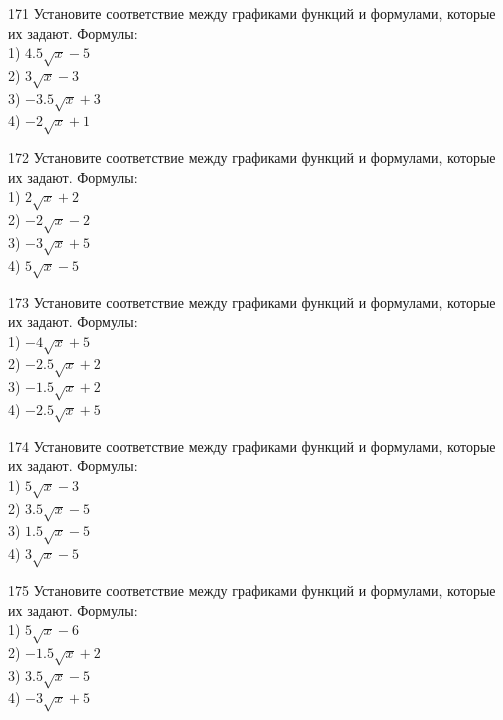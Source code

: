 \documentclass[4apaper]{article}
\begin{document}
\begin{taskBN}{171}
Установите соответствие между графиками функций и формулами, которые их задают. Формулы: \\1) $4.5\sqrt{x}-5$\\2) $3\sqrt{x}-3$\\3) $-3.5\sqrt{x}+3$\\4) $-2\sqrt{x}+1$
\end{taskBN}

\begin{taskBN}{172}
Установите соответствие между графиками функций и формулами, которые их задают. Формулы: \\1) $2\sqrt{x}+2$\\2) $-2\sqrt{x}-2$\\3) $-3\sqrt{x}+5$\\4) $5\sqrt{x}-5$
\end{taskBN}

\begin{taskBN}{173}
Установите соответствие между графиками функций и формулами, которые их задают. Формулы: \\1) $-4\sqrt{x}+5$\\2) $-2.5\sqrt{x}+2$\\3) $-1.5\sqrt{x}+2$\\4) $-2.5\sqrt{x}+5$
\end{taskBN}

\begin{taskBN}{174}
Установите соответствие между графиками функций и формулами, которые их задают. Формулы: \\1) $5\sqrt{x}-3$\\2) $3.5\sqrt{x}-5$\\3) $1.5\sqrt{x}-5$\\4) $3\sqrt{x}-5$
\end{taskBN}

\begin{taskBN}{175}
Установите соответствие между графиками функций и формулами, которые их задают. Формулы: \\1) $5\sqrt{x}-6$\\2) $-1.5\sqrt{x}+2$\\3) $3.5\sqrt{x}-5$\\4) $-3\sqrt{x}+5$
\end{taskBN}
\end{document}
